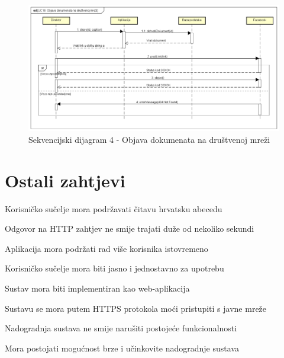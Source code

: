 				\begin{figure}[H]
					\includegraphics[scale=0.5]{slike/uc16_objava_dokumenata_na_drustvenoj_mrezi.PNG} %
					\centering
					\caption{Sekvencijski dijagram 4 - Objava dokumenata na društvenoj mreži}
					\label{fig:promjene}
				\end{figure}
	
		\section{Ostali zahtjevi}
		
		\begin{packed_item}
			\item Korisničko sučelje mora podržavati čitavu hrvatsku abecedu
			
			\item Odgovor na HTTP zahtjev ne smije trajati duže od nekoliko sekundi
			
			\item Aplikacija mora podržati rad više korisnika istovremeno
			
			\item Korisničko sučelje mora biti jasno i jednostavno za upotrebu
			
			\item Sustav mora biti implementiran kao web-aplikacija
			
			\item Sustavu se mora putem HTTPS protokola moći pristupiti s javne mreže
			
			\item Nadogradnja sustava ne smije narušiti postojeće funkcionalnosti
			
			\item Mora postojati mogućnost brze i učinkovite nadogradnje sustava
			
		\end{packed_item}
		
			
			 
			 
			 
	